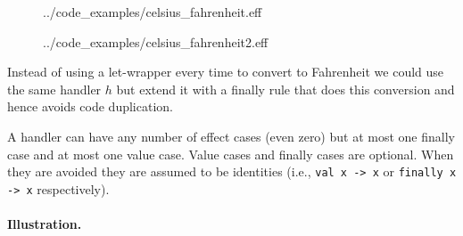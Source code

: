 \documentclass[class=article, crop=false]{standalone}
\begin{document}
\begin{figure}
  \begin{minipage}{.5\textwidth}
    
    {../code_examples/celsius_fahrenheit.eff}
  \end{minipage}%
  \begin{minipage}{.5\textwidth}
    
    {../code_examples/celsius_fahrenheit2.eff}
  \end{minipage}%
\end{figure}

Instead of using a let-wrapper every time to convert to Fahrenheit we could
use the same handler $h$ but extend it with a finally rule that does this
conversion and hence avoids code duplication.

A handler can have any number of effect cases (even zero) but at most one
finally case and at most one value case. Value cases and finally cases are
optional. When they are avoided they are assumed to be identities (i.e.,
\lstinline{val x -> x} or \lstinline{finally x -> x} respectively).

\paragraph{Illustration.}
\end{document}
